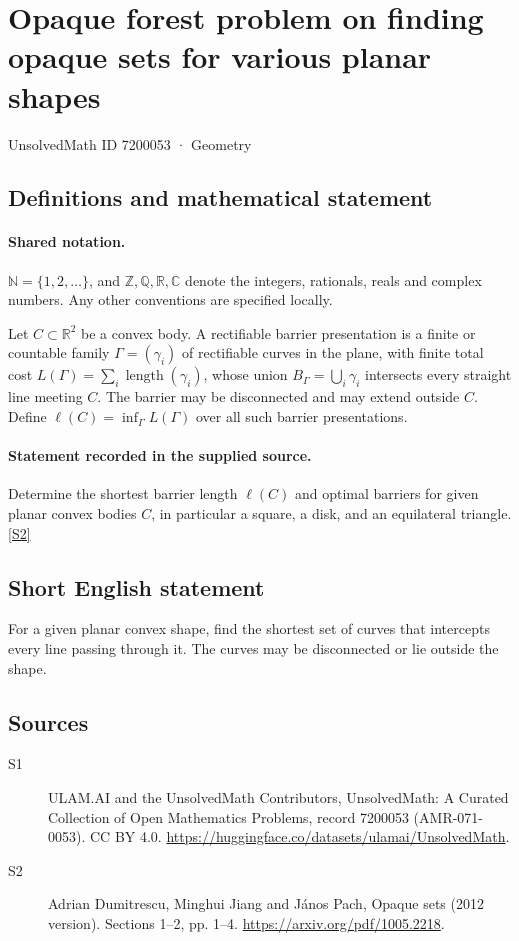 \documentclass[11pt]{article}
\newcommand{\sref}[2]{\hyperlink{source:#1:#2}{[S#2]}}
\begin{document}
\setcounter{section}{7200052}
\section{Opaque forest problem on finding opaque sets for various planar shapes}\label{7200053}
{\small\sffamily UnsolvedMath ID 7200053 · Geometry}
\subsection{Definitions and mathematical statement}

\paragraph{Shared notation.}$\mathbb N=\{1,2,\ldots\}$, and $\mathbb Z,\mathbb Q,\mathbb R,\mathbb C$ denote the integers, rationals, reals and complex numbers. Any other conventions are specified locally.


Let $C\subset\mathbb R^2$ be a convex body. A rectifiable barrier presentation is a finite or countable family $\Gamma=(\gamma_i)$ of rectifiable curves in the plane, with finite total cost $L(\Gamma)=\sum_i\operatorname{length}(\gamma_i)$, whose union $B_\Gamma=\bigcup_i\gamma_i$ intersects every straight line meeting $C$. The barrier may be disconnected and may extend outside $C$. Define $\ell(C)=\inf_\Gamma L(\Gamma)$ over all such barrier presentations.
\paragraph{Statement recorded in the supplied source.}
Determine the shortest barrier length $\ell(C)$ and optimal barriers for given planar convex bodies $C$, in particular a square, a disk, and an equilateral triangle. \sref{7200053}{2}
\subsection{Short English statement}
For a given planar convex shape, find the shortest set of curves that intercepts every line passing through it. The curves may be disconnected or lie outside the shape.
\subsection{Sources}
\begin{description}
\item[\hypertarget{source:7200053:1}{S1}] ULAM.AI and the UnsolvedMath Contributors, UnsolvedMath: A Curated Collection of Open Mathematics Problems, record 7200053 (AMR-071-0053). CC BY 4.0. \url{https://huggingface.co/datasets/ulamai/UnsolvedMath}.
\item[\hypertarget{source:7200053:2}{S2}] Adrian Dumitrescu, Minghui Jiang and János Pach, Opaque sets (2012 version). Sections 1–2, pp. 1–4. \url{https://arxiv.org/pdf/1005.2218}.
\end{description}
\label{end:7200053}
\end{document}
